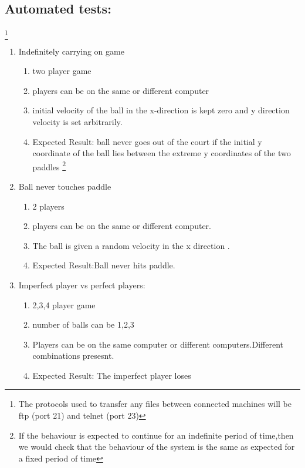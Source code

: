 \subsection{Automated tests:}
\footnote{The protocols used to transfer any files between connected machines will be ftp (port 21) and telnet (port 23)}
\begin{enumerate}
\item {Indefinitely carrying on game}
\begin{enumerate}
	\item {two player game}
	\item{ players can be on the same or different computer}
	\item {initial velocity of the ball in the x-direction is kept zero and y direction velocity is set arbitrarily.}
	\item{Expected Result: ball never goes out of the court if the initial y coordinate of the ball lies between the extreme y coordinates of the 
	      two paddles}
	\footnote{If the behaviour is expected to continue for an indefinite period of time,then we would check that the behaviour of the system is the same as expected for a fixed period of time}
	\end{enumerate}
\item{Ball never touches paddle}
	\begin{enumerate}
	\item {2 players}
	\item {players can be on the same or different computer.}
	\item {The ball is given a random velocity in the x direction .}
	\item {Expected Result:Ball never hits paddle.}
	\end{enumerate}
\item{Imperfect player vs perfect players:}
	\begin{enumerate}
	\item {2,3,4 player game}
	\item{number of balls can be 1,2,3}
	\item {Players can be on the same computer or different computers.Different combinations presesnt.}
	\item {Expected Result: The imperfect player loses}
	\end{enumerate}
\end{enumerate}

